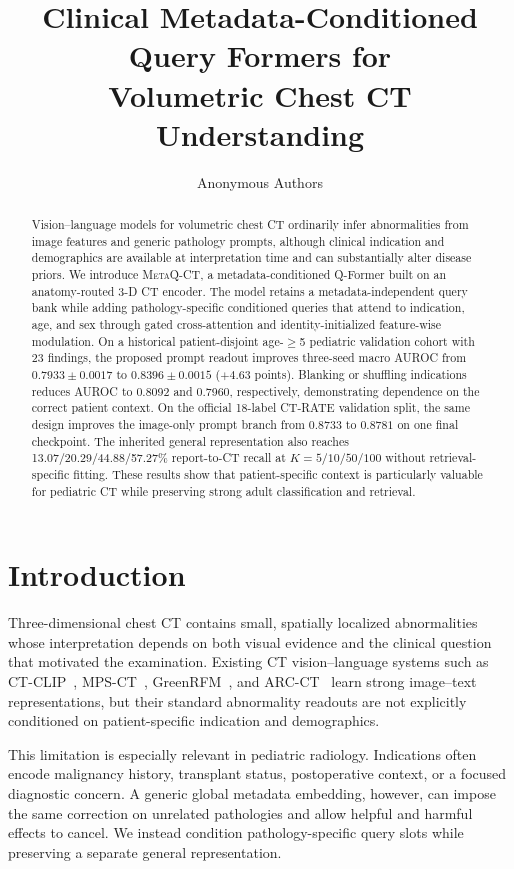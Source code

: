 \documentclass[10pt,twocolumn]{article}
\title{Clinical Metadata-Conditioned Query Formers for\\
Volumetric Chest CT Understanding}
\author{Anonymous Authors}
\date{}
\newcommand{\ours}{\textsc{MetaQ-CT}}
\begin{document}
\maketitle

\begin{abstract}
Vision--language models for volumetric chest CT ordinarily infer abnormalities
from image features and generic pathology prompts, although clinical
indication and demographics are available at interpretation time and can
substantially alter disease priors. We introduce \ours, a
metadata-conditioned Q-Former built on an anatomy-routed 3-D CT encoder. The
model retains a metadata-independent query bank while adding pathology-specific
conditioned queries that attend to indication, age, and sex through gated
cross-attention and identity-initialized feature-wise modulation. On a
historical patient-disjoint age-$\geq$5 pediatric validation cohort with 23
findings, the proposed prompt readout
improves three-seed macro AUROC from $0.7933\pm0.0017$ to
$0.8396\pm0.0015$ ($+4.63$ points). Blanking or shuffling indications reduces
AUROC to 0.8092 and 0.7960, respectively, demonstrating dependence on the
correct patient context. On the official 18-label CT-RATE validation split,
the same design improves the image-only prompt branch from $0.8733$ to
$0.8781$ on one final checkpoint.
The inherited general representation also reaches 13.07/20.29/44.88/57.27\%
report-to-CT recall at $K=5/10/50/100$ without retrieval-specific fitting.
These results show that patient-specific context is particularly valuable for
pediatric CT while preserving strong adult classification and retrieval.
\end{abstract}

\section{Introduction}
Three-dimensional chest CT contains small, spatially localized abnormalities
whose interpretation depends on both visual evidence and the clinical question
that motivated the examination. Existing CT vision--language systems such as
CT-CLIP~\cite{hamamci2024ctclip}, MPS-CT~\cite{li2025mpsct},
GreenRFM~\cite{li2026greenrfm}, and ARC-CT~\cite{isik2026arcct} learn strong
image--text representations, but their standard abnormality readouts are not
explicitly conditioned on patient-specific indication and demographics.

This limitation is especially relevant in pediatric radiology. Indications
often encode malignancy history, transplant status, postoperative context, or
a focused diagnostic concern. A generic global metadata embedding, however,
can impose the same correction on unrelated pathologies and allow helpful and
harmful effects to cancel. We instead condition pathology-specific query slots
while preserving a separate general representation.
\end{document}
